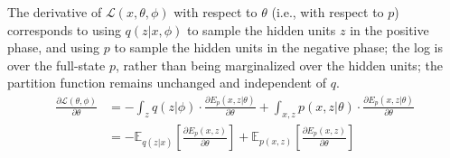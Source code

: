 \documentclass{article} %
\def\KL{\text{KL}}
\begin{document}

The derivative of $\mathcal{L}(x, \theta, \phi)$ with respect to $\theta$ (i.e., with respect to $p$) corresponds to using $q(z|x,\phi)$ to sample the hidden units $z$ in the positive phase, and using $p$ to sample the hidden units in the negative phase; the log is over the full-state $p$, rather than being marginalized over the hidden units; the partition function remains unchanged and independent of $q$.  
\begin{align}
\frac{\partial \mathcal{L}(\theta, \phi)}{\partial \theta} &= -\int_z q(z|\phi) \cdot \frac{\partial E_p(x, z| \theta)}{\partial \theta} + \int_{x, z} p(x,z|\theta) \cdot \frac{\partial E_p(x, z | \theta)}{\partial \theta} \nonumber \\
&= -\mathbb{E}_{q(z|x)} \left[ \frac{\partial E_p(x,z)}{\partial \theta} \right] + \mathbb{E}_{p(x,z)} \left[ \frac{\partial E_p(x,z)}{\partial \theta} \right] \label{KL-gradient-p}
\end{align}
\end{document}
